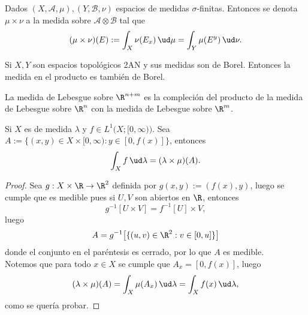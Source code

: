 \begin{mydefi}
	Dados $(X,\mathcal{A},\mu),(Y,\mathcal{B},\nu)$ espacios de medidas $\sigma$-finitas.
	Entonces se denota $\mu\times\nu$ a la medida sobre $\mathcal{A\otimes B}$ tal que
	$$ (\mu\times\nu)(E) := \int_X \nu(E_x)\,\ud\mu = \int_Y \mu(E^y)\,\ud\nu. $$
\end{mydefi}

\begin{prop}
	Si $X,Y$ son espacios topológicos 2AN y sus medidas son de Borel.
	Entonces la medida en el producto es también de Borel.
\end{prop}

\begin{cor}
	La medida de Lebesgue sobre $\R^{n+m}$ es la compleción del producto de la medida de Lebesgue sobre $\R^n$ con la medida de Lebesgue sobre $\R^m$.
\end{cor}

\begin{thm}
	Si $X$ es de medida $\lambda$ y $f \in L^1\big( X;[0,\infty) \big)$.
	Sea $A := \{(x,y)\in X\times[0,\infty) : y \in [0,f(x)]\}$, entonces
	$$ \int_X f\,\ud\lambda = (\lambda\times\mu)(A). $$
\end{thm}
\begin{proof}
	Sea $g:X\times\R \to \R^2$ definida por $g(x,y) := (f(x), y)$, luego se cumple que es medible pues si $U,V$ son abiertos en $\R$, entonces
	$$ g^{-1}[U\times V] = f^{-1}[U]\times V, $$
	luego
	$$ A = g^{-1}\big[ \{(u,v)\in\R^2 : v \in [0,u]\} \big] $$
	donde el conjunto en el paréntesis es cerrado, por lo que $A$ es medible.
	\\
	Notemos que para todo $x\in X$ se cumple que $A_x = [0, f(x)]$, luego
	$$ (\lambda\times\mu)(A) = \int_X \mu(A_x)\,\ud\lambda = \int_X f(x)\,\ud\lambda, $$
	como se quería probar.
\end{proof}

